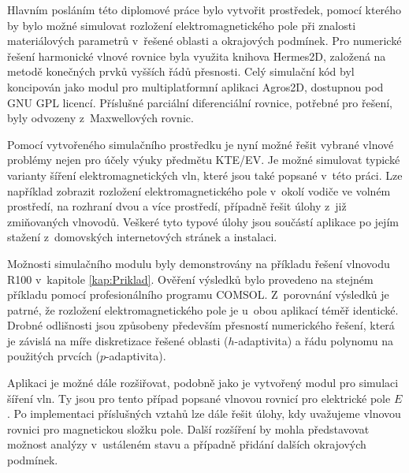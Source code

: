 
Hlavním posláním této diplomové práce bylo vytvořit prostředek, pomocí kterého by bylo možné simulovat rozložení elektromagnetického pole při znalosti materiálových parametrů v~řešené oblasti a okrajových podmínek. Pro numerické řešení harmonické vlnové rovnice byla využita knihova Hermes2D, založená na metodě konečných prvků vyšších řádů přesnosti.
Celý simulační kód byl koncipován jako modul pro multiplatformní aplikaci Agros2D, dostupnou pod GNU GPL licencí. Příslušné parciální diferenciální rovnice, potřebné pro řešení, byly odvozeny z~Maxwellových rovnic.

Pomocí vytvořeného simulačního prostředku je nyní možné řešit vybrané vlnové problémy nejen pro účely výuky předmětu KTE/EV. Je možné simulovat typické varianty šíření elektromagnetických vln, které jsou také popsané v~této práci. Lze například zobrazit rozložení elektromagnetického pole v~okolí vodiče ve volném prostředí, na rozhraní dvou a více prostředí, případně řešit úlohy z~již zmiňovaných vlnovodů. Veškeré tyto typové úlohy jsou součástí aplikace po jejím stažení z~domovských internetových stránek a instalaci. 

Možnosti simulačního modulu byly demonstrovány na příkladu řešení vlnovodu R100 v~kapitole \ref{kap:Priklad}. Ověření výsledků bylo provedeno na stejném příkladu pomocí profesionálního programu COMSOL. Z~porovnání výsledků je patrné, že rozložení elektromagnetického pole je u~obou aplikací téměř identické. Drobné odlišnosti jsou způsobeny především přesností numerického řešení, která je závislá na míře diskretizace řešené oblasti ($h$-adaptivita) a řádu polynomu na použitých prvcích ($p$-adaptivita).

Aplikaci je možné dále rozšiřovat, podobně jako je vytvořený modul pro simulaci šíření vln. Ty jsou pro tento případ popsané vlnovou rovnicí pro elektrické pole $E$. Po implementaci příslušných vztahů lze dále řešit úlohy, kdy uvažujeme vlnovou rovnici pro magnetickou složku pole. Další rozšíření by mohla představovat možnost analýzy v~ustáleném stavu a případně přidání dalších okrajových podmínek. 






